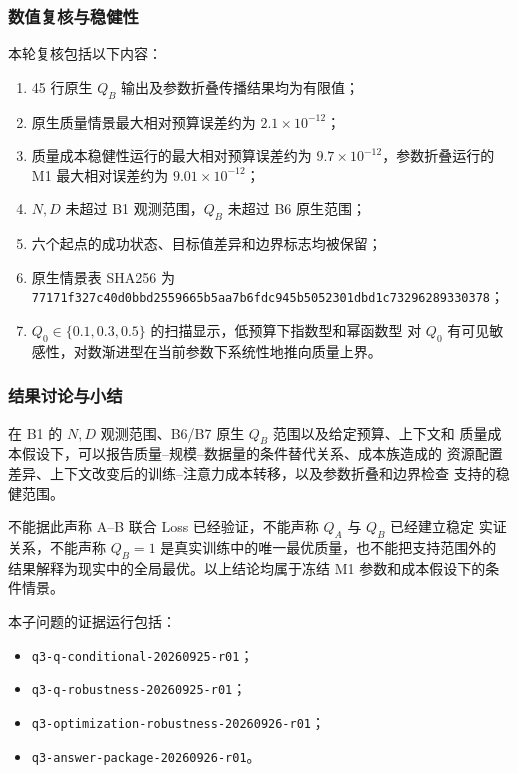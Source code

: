 \subsubsection{数值复核与稳健性}

本轮复核包括以下内容：
\begin{enumerate}
  \item 45 行原生 $Q_B$ 输出及参数折叠传播结果均为有限值；
  \item 原生质量情景最大相对预算误差约为 $2.1\times10^{-12}$；
  \item 质量成本稳健性运行的最大相对预算误差约为
  $9.7\times10^{-12}$，参数折叠运行的 M1 最大相对误差约为
  $9.01\times10^{-12}$；
  \item $N,D$ 未超过 B1 观测范围，$Q_B$ 未超过 B6 原生范围；
  \item 六个起点的成功状态、目标值差异和边界标志均被保留；
  \item 原生情景表 SHA256 为
  {\scriptsize\texttt{77171f327c40d0bbd2559665b5aa7b6fdc945b5052301dbd1c73296289330378}}；
  \item $Q_0\in\{0.1,0.3,0.5\}$ 的扫描显示，低预算下指数型和幂函数型
  对 $Q_0$ 有可见敏感性，对数渐进型在当前参数下系统性地推向质量上界。
\end{enumerate}

\subsubsection{结果讨论与小结}

在 B1 的 $N,D$ 观测范围、B6/B7 原生 $Q_B$ 范围以及给定预算、上下文和
质量成本假设下，可以报告质量--规模--数据量的条件替代关系、成本族造成的
资源配置差异、上下文改变后的训练--注意力成本转移，以及参数折叠和边界检查
支持的稳健范围。

不能据此声称 A--B 联合 Loss 已经验证，不能声称 $Q_A$ 与 $Q_B$ 已经建立稳定
实证关系，不能声称 $Q_B=1$ 是真实训练中的唯一最优质量，也不能把支持范围外的
结果解释为现实中的全局最优。以上结论均属于冻结 M1 参数和成本假设下的条件情景。

本子问题的证据运行包括：
\begin{itemize}
  \item \texttt{q3-q-conditional-20260925-r01}；
  \item \texttt{q3-q-robustness-20260925-r01}；
  \item \texttt{q3-optimization-robustness-20260926-r01}；
  \item \texttt{q3-answer-package-20260926-r01}。
\end{itemize}
